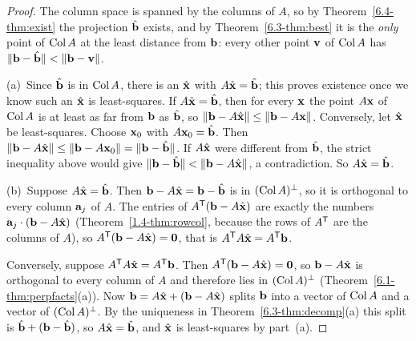 \documentclass[11pt]{article}
\begin{document}
\begin{proof}
The column space is spanned by the columns of $A$, so by Theorem~\ref{6.4-thm:exist} the projection $\hat{\mathbf{b}}$ exists, and by Theorem~\ref{6.3-thm:best} it is the \emph{only} point of $\operatorname{Col} A$ at the least distance from $\mathbf{b}$: every other point $\mathbf{v}$ of $\operatorname{Col} A$ has $\lVert\mathbf{b}-\hat{\mathbf{b}}\rVert<\lVert\mathbf{b}-\mathbf{v}\rVert$.

(a)~Since $\hat{\mathbf{b}}$ is in $\operatorname{Col} A$, there is an $\hat{\mathbf{x}}$ with $A\hat{\mathbf{x}}=\hat{\mathbf{b}}$; this proves existence once we know such an $\hat{\mathbf{x}}$ is least-squares. If $A\hat{\mathbf{x}}=\hat{\mathbf{b}}$, then for every $\mathbf{x}$ the point $A\mathbf{x}$ of $\operatorname{Col} A$ is at least as far from $\mathbf{b}$ as $\hat{\mathbf{b}}$, so $\lVert\mathbf{b}-A\hat{\mathbf{x}}\rVert\le\lVert\mathbf{b}-A\mathbf{x}\rVert$. Conversely, let $\hat{\mathbf{x}}$ be least-squares. Choose $\mathbf{x}_0$ with $A\mathbf{x}_0=\hat{\mathbf{b}}$. Then $\lVert\mathbf{b}-A\hat{\mathbf{x}}\rVert\le\lVert\mathbf{b}-A\mathbf{x}_0\rVert=\lVert\mathbf{b}-\hat{\mathbf{b}}\rVert$. If $A\hat{\mathbf{x}}$ were different from $\hat{\mathbf{b}}$, the strict inequality above would give $\lVert\mathbf{b}-\hat{\mathbf{b}}\rVert<\lVert\mathbf{b}-A\hat{\mathbf{x}}\rVert$, a contradiction. So $A\hat{\mathbf{x}}=\hat{\mathbf{b}}$.

(b)~Suppose $A\hat{\mathbf{x}}=\hat{\mathbf{b}}$. Then $\mathbf{b}-A\hat{\mathbf{x}}=\mathbf{b}-\hat{\mathbf{b}}$ is in $(\operatorname{Col} A)^{\perp}$, so it is orthogonal to every column $\mathbf{a}_j$ of $A$. The entries of $A^{\mathsf T}(\mathbf{b}-A\hat{\mathbf{x}})$ are exactly the numbers $\mathbf{a}_j\cdot(\mathbf{b}-A\hat{\mathbf{x}})$ (Theorem~\ref{1.4-thm:rowcol}, because the rows of $A^{\mathsf T}$ are the columns of $A$), so $A^{\mathsf T}(\mathbf{b}-A\hat{\mathbf{x}})=\mathbf{0}$, that is $A^{\mathsf T} A\hat{\mathbf{x}}=A^{\mathsf T}\mathbf{b}$.

Conversely, suppose $A^{\mathsf T} A\hat{\mathbf{x}}=A^{\mathsf T}\mathbf{b}$. Then $A^{\mathsf T}(\mathbf{b}-A\hat{\mathbf{x}})=\mathbf{0}$, so $\mathbf{b}-A\hat{\mathbf{x}}$ is orthogonal to every column of $A$ and therefore lies in $(\operatorname{Col} A)^{\perp}$ (Theorem~\ref{6.1-thm:perpfacts}(a)). Now $\mathbf{b}=A\hat{\mathbf{x}}+(\mathbf{b}-A\hat{\mathbf{x}})$ splits $\mathbf{b}$ into a vector of $\operatorname{Col} A$ and a vector of $(\operatorname{Col} A)^{\perp}$. By the uniqueness in Theorem~\ref{6.3-thm:decomp}(a) this split is $\hat{\mathbf{b}}+(\mathbf{b}-\hat{\mathbf{b}})$, so $A\hat{\mathbf{x}}=\hat{\mathbf{b}}$, and $\hat{\mathbf{x}}$ is least-squares by part~(a).
\end{proof}
\end{document}
